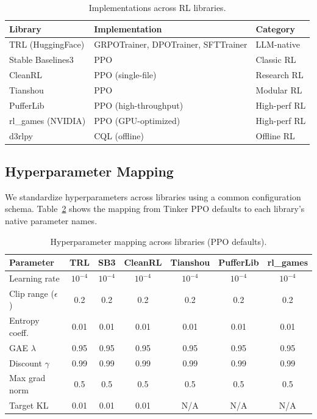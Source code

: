 \documentclass{article}
\begin{document}
\begin{table}[htbp]
\centering
\caption{Implementations across RL libraries.}
\label{tab:implementations}
\begin{tabular}{lll}
\toprule
\textbf{Library} & \textbf{Implementation} & \textbf{Category} \\
\midrule
TRL (HuggingFace) & GRPOTrainer, DPOTrainer, SFTTrainer & LLM-native \\
Stable Baselines3 & PPO & Classic RL \\
CleanRL & PPO (single-file) & Research RL \\
Tianshou & PPO & Modular RL \\
PufferLib & PPO (high-throughput) & High-perf RL \\
rl\_games (NVIDIA) & PPO (GPU-optimized) & High-perf RL \\
d3rlpy & CQL (offline) & Offline RL \\
\bottomrule
\end{tabular}
\end{table}

\subsection{Hyperparameter Mapping}

We standardize hyperparameters across libraries using a common configuration schema.
Table~\ref{tab:hyperparams} shows the mapping from Tinker PPO defaults to each library's
native parameter names.

\begin{table}[htbp]
\centering
\caption{Hyperparameter mapping across libraries (PPO defaults).}
\label{tab:hyperparams}
\begin{tabular}{lcccccc}
\toprule
\textbf{Parameter} & \textbf{TRL} & \textbf{SB3} & \textbf{CleanRL} & \textbf{Tianshou} & \textbf{PufferLib} & \textbf{rl\_games} \\
\midrule
Learning rate & $10^{-4}$ & $10^{-4}$ & $10^{-4}$ & $10^{-4}$ & $10^{-4}$ & $10^{-4}$ \\
Clip range ($\epsilon$) & 0.2 & 0.2 & 0.2 & 0.2 & 0.2 & 0.2 \\
Entropy coeff. & 0.01 & 0.01 & 0.01 & 0.01 & 0.01 & 0.01 \\
GAE $\lambda$ & 0.95 & 0.95 & 0.95 & 0.95 & 0.95 & 0.95 \\
Discount $\gamma$ & 0.99 & 0.99 & 0.99 & 0.99 & 0.99 & 0.99 \\
Max grad norm & 0.5 & 0.5 & 0.5 & 0.5 & 0.5 & 0.5 \\
Target KL & 0.01 & 0.01 & 0.01 & N/A & N/A & N/A \\
\bottomrule
\end{tabular}
\end{table}
\end{document}
